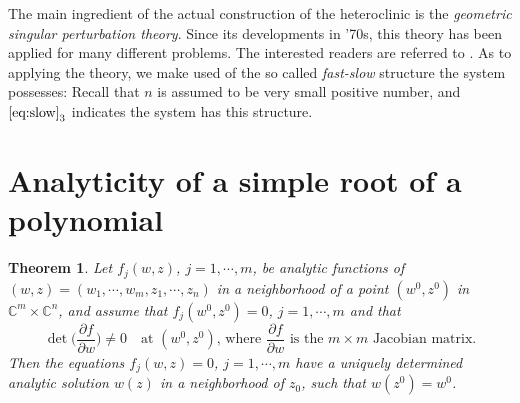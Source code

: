 \documentclass[a4paper,11pt]{article}
\newtheorem{theorem}{Theorem}
\theoremstyle{remark}
\begin{document}
The main ingredient of the actual construction of the heteroclinic is the {\it geometric singular perturbation theory}. Since its developments in '70s, this theory has been applied  for many different problems. The interested readers are referred to \cite{Fenichel79}. As to applying the theory, we make used of the so called {\it fast-slow} structure the system possesses: Recall that $n$ is assumed to be very small positive number, and $\eqref{eq:slow}_3$ indicates the system has this structure.
% 
% 
% 
% 


\pagebreak

\appendix
\renewcommand\thetheorem{\Alph{theorem}}
\setcounter{theorem}{\thetmp}
\section{Analyticity of a simple root of a polynomial}



\begin{theorem}{\cite[p. 24]{Hormander66}} \label{thm:anal} Let $f_j(w,z)$, $j=1,\cdots,m$, be analytic functions of $(w,z)=(w_1,\cdots,w_m,z_1,\cdots,z_n)$ in a neighborhood of a point $(w^0,z^0)$ in $\mathbb{C}^m\times \mathbb{C}^n$, and assume that $f_j(w^0,z^0)=0$, $j=1,\cdots,m$ and that 
$$ \det\Big( \frac{\partial f}{\partial w} \Big) \ne 0 \quad \text{at $(w^0,z^0)$, where $\frac{\partial f}{\partial w}$ is the $m\times m$ Jacobian matrix.} $$
Then the equations $f_j(w,z)=0$, $j=1,\cdots,m$ have a uniquely determined analytic solution $w(z)$ in a neighborhood of $z_0$, such that $w(z^0)=w^0$.
\end{theorem}
\end{document}
